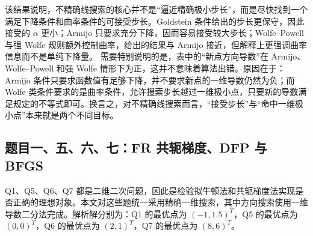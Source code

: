\documentclass[UTF8,a4paper,12pt,fontset=none]{ctexart}
\begin{document}
\begin{table}[H]
\centering
\scriptsize
{}
\caption{Q3 不精确一维搜索结果摘要}
\end{table}

该结果说明，不精确线搜索的核心并不是“逼近精确极小步长”，而是尽快找到一个满足下降条件和曲率条件的可接受步长。Goldstein 条件给出的步长更保守，因此接受的 $\alpha$ 更小；Armijo 只要求充分下降，因而容易接受较大步长；Wolfe--Powell 与强 Wolfe 规则额外控制曲率，给出的结果与 Armijo 接近，但解释上更强调曲率信息而不是单纯下降量。
需要特别说明的是，表中的“新点方向导数”在 Armijo、Wolfe--Powell 和强 Wolfe 情形下为正，这并不意味着算法出错。原因在于：Armijo 条件只要求函数值有足够下降，并不要求新点的一维导数仍然为负；而 Wolfe 类条件要求的是曲率条件，允许搜索步长越过一维极小点，只要新的导数满足规定的不等式即可。换言之，对不精确线搜索而言，“接受步长”与“命中一维极小点”本来就是两个不同目标。

\subsection{题目一、五、六、七：FR 共轭梯度、DFP 与 BFGS}

Q1、Q5、Q6、Q7 都是二维二次问题，因此是检验拟牛顿法和共轭梯度法实现是否正确的理想对象。本文对这些题统一采用精确一维搜索，其中方向搜索使用一维导数二分法完成。解析解分别为：Q1 的最优点为 $(-1,1.5)^T$，Q5 的最优点为 $(0,0)^T$，Q6 的最优点为 $(2,1)^T$，Q7 的最优点为 $(8,6)^T$。

\begin{table}[H]
\centering
\scriptsize
{}
\caption{Q1、Q5、Q6、Q7 的数值结果摘要}
\end{table}
\end{document}
